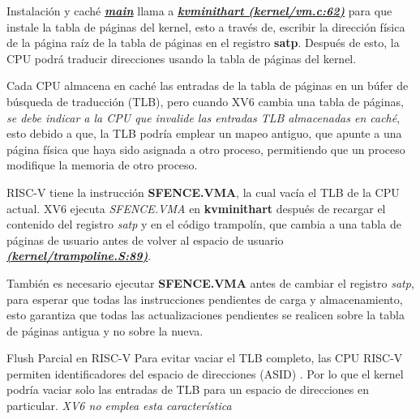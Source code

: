 \documentclass{libs/ufc_format}
\begin{document}
\begin{frame}{Instalación y caché}
    \href{https://github.com/CarlosSandoval-03/xv6-riscv/blob/riscv/kernel/main.c\#L20}{\textbf{\textit{main}}} llama a \href{https://github.com/CarlosSandoval-03/xv6-riscv/blob/riscv/kernel/vm.c\#L62}{\textbf{\textit{kvminithart (kernel/vm.c:62)}}} para que instale la tabla de páginas del kernel, esto a través de, escribir la dirección física de la página raíz de la tabla de páginas en el registro \textbf{satp}. Después de esto, la CPU podrá traducir direcciones usando la tabla de páginas del kernel. \cite{xv6_book} \cite{xv6} \newline

    \vspace{0.3cm}

    Cada CPU almacena en caché las entradas de la tabla de páginas en un búfer de búsqueda de traducción (TLB), pero cuando XV6 cambia una tabla de páginas, \emph{se debe indicar a la CPU que invalide las entradas TLB almacenadas en caché}, esto debido a que, la TLB podría emplear un mapeo antiguo, que apunte a una página física que haya sido asignada a otro proceso, permitiendo que un proceso modifique la memoria de otro proceso. \cite{xv6_book} \cite{xv6}
\end{frame}
\begin{frame}{}
    RISC-V tiene la instrucción \textbf{SFENCE.VMA}, la cual vacía el TLB de la CPU actual. XV6 ejecuta \textit{SFENCE.VMA} en \textbf{kvminithart} después de recargar el contenido del registro \textit{satp} y en el código trampolín, que cambia a una tabla de páginas de usuario antes de volver al espacio de usuario \href{https://github.com/CarlosSandoval-03/xv6-riscv/blob/riscv/kernel/trampoline.S\#L89}{\textbf{\textit{(kernel/trampoline.S:89)}}}. \cite{riscv:priv}

    \vspace{0.3cm}

    También es necesario ejecutar \textbf{SFENCE.VMA} antes de cambiar el registro \textit{satp}, para esperar que todas las instrucciones pendientes de carga y almacenamiento, esto garantiza que todas las actualizaciones pendientes se realicen sobre la tabla de páginas antigua y no sobre la nueva. \cite{xv6_book} \cite{xv6}
\end{frame}
    \begin{frame}{Flush Parcial en RISC-V}
    Para evitar vaciar el TLB completo, las CPU RISC-V permiten identificadores del espacio de direcciones (ASID) \cite{xv6_book} \cite{riscv:priv}. Por lo que el kernel podría vaciar solo las entradas de TLB para un espacio de direcciones en particular. \newline
    \emph{XV6 no emplea esta característica}
\end{frame}
\end{document}
